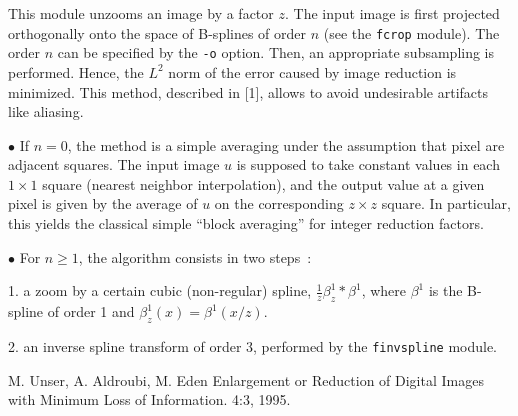 This module unzooms an image by a factor $z$. The input image is first
projected orthogonally onto the space of B-splines of order $n$ (see
the \verb+fcrop+ module). The order $n$ can be specified 
by the \verb+-o+ option. Then, an appropriate subsampling is performed.
Hence, the $L^2$ norm of the error caused by image reduction is minimized.
This method, described in [1], allows to avoid undesirable artifacts like 
aliasing. 

\medskip

$\bullet$ 
If $n=0$, the method is a simple averaging under the assumption that pixel
are adjacent squares. The input image $u$ is supposed to take constant values
in each $1\times 1$ square (nearest neighbor interpolation), and the output
value at a given pixel is given by the average of $u$ on the corresponding
$z\times z$ square. In particular, this yields the classical simple 
``block averaging'' for integer reduction factors.

\medskip

$\bullet$ 
For $n\geq 1$, the algorithm consists in two steps~:

1. a zoom by a certain cubic (non-regular) spline, 
$\frac 1z \beta^1_z * \beta^1$, where $\beta^1$ is the 
B-spline of order 1 and $\beta^1_z(x)=\beta^1(x/z)$.

2. an inverse spline transform of order 3, performed by the
\verb+finvspline+ module.


\begin{thebibliography}{99}
M. Unser, A. Aldroubi, M. Eden
\newblock Enlargement or Reduction of Digital Images 
with Minimum Loss of Information.
 4:3, 1995.
\end{thebibliography}
